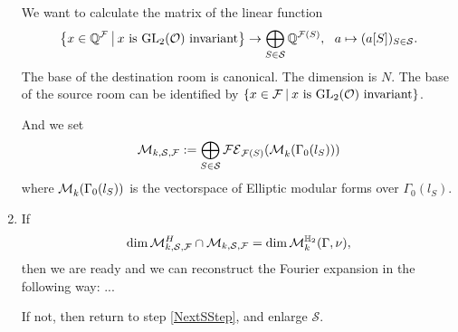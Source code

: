 \begin{algo}
\begin{enumerate}
We want to calculate the matrix of the linear function \[
\invar{\Q^\F}{\GL_2(\curlO)} \rightarrow \bigoplus_{S\in\mathcal{S}} \Q^{\FPrecisionLimit{S}}, \ \ 
a \mapsto (a[S])_{S\in\mathcal{S}} .
\]
The base of the destination room is canonical. The dimension is $N$.
The base of the source room can be identified by $\invar{\F}{\GL_2(\curlO)}$.

And we set
\[ \mathcal{M}_{k, \mathcal{S},\mathcal{F}} := \bigoplus_{S\in\mathcal{S}} \mathcal{FE}_{\mathcal{F}(S)}(\operatorname{\mathcal{M}}^{}_k (\Gamma_0(l_S))) \]
where $\operatorname{\mathcal{M}}^{}_k (\Gamma_0(l_S))$ is the vectorspace of Elliptic modular forms over $\Gamma_0(l_S)$. %

\item
If
\[ \dim \mathcal{M}_{k,\mathcal{S},\mathcal{F}}^H \cap \mathcal{M}_{k, \mathcal{S},\mathcal{F}}
= \dim \operatorname{\mathcal{M}}^{\mathbb{H}_{2}}_k (\Gamma,\nu) , \]
then we are ready and we can reconstruct the Fourier expansion in the following way: ...

If not, then return to step \ref{NextSStep}, and enlarge $\mathcal{S}$.
\end{enumerate}
\end{algo}

